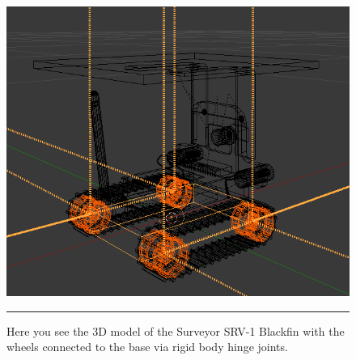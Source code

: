 \begin{figure}[htbp]
\centering
\includegraphics[scale=0.5]{../Figures/Chapter5/srv1.png}
\rule{35em}{0.5pt}
\caption[SRV-1 3D Model]{Here you see the 3D model of the Surveyor SRV-1 Blackfin with the wheels connected to the base via rigid body hinge joints.}
\label{fig:srv1_3d_model}
\end{figure}

